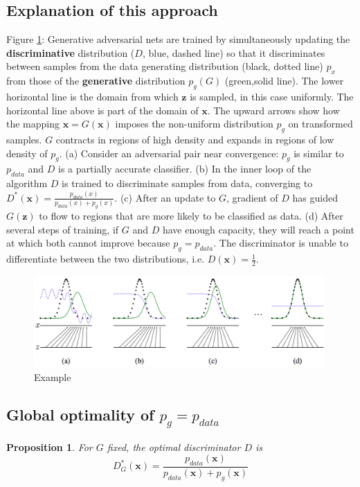 \documentclass{article} %
\newtheorem{proposition}{Proposition}
\theoremstyle{definition}
\begin{document}
\subsection{Explanation of this approach}
Figure \ref{fig:gan1}: Generative adversarial nets are trained by simultaneously updating the \textbf{discriminative} distribution ($D$, blue, dashed line) so that it discriminates between samples from the data generating distribution (black, dotted line) $p_x$ from those of the \textbf{generative} distribution $p_g(G)$ (green,solid line). The lower horizontal line is the domain from which $\textbf{z}$ is sampled, in this case uniformly. The horizontal line above is part of the domain of $\textbf{x}$. The upward arrows show how the mapping $\textbf{x}=G(\textbf{x})$ imposes the non-uniform distribution $p_g$ on transformed samples. $G$ contracts in regions of high density and expands in regions of low density of $p_g$. (a) Consider an adversarial pair near convergence: $p_g$ is similar to $p_{data}$ and $D$ is a partially accurate classifier. (b) In the inner loop of the algorithm $D$ is trained to discriminate samples from data, converging to $D^*(\textbf{x})=\frac{p_{data}(x)}{p_{data}(x)+p_g(x)}$. (c) After an update to $G$, gradient of $D$ has guided $G(\textbf{z})$ to flow to regions that are more likely to be classified as data. (d) After several steps of training, if $G$ and $D$ have enough capacity, they will reach a point at which both cannot improve because $p_g = p_{data}$. The discriminator is unable to differentiate between the two distributions, i.e. $D(\textbf{x}) = \frac{1}{2}$.
\begin{figure}[H]
	\centering
	\includegraphics[width=0.9\linewidth]{1}
	\caption{Example}
	\label{fig:gan1}
\end{figure}

\subsection{Global optimality of $p_g = p_{data}$}

\begin{proposition}
For $G$ fixed, the optimal discriminator $D$ is
\begin{equation}
    D_G^*(\textbf{x}) = \frac{p_{data}(\textbf{x})}{p_{data}(\textbf{x})+p_g(\textbf{x})}
\label{eq:prop1}
\end{equation}
\end{proposition}
\end{document}
